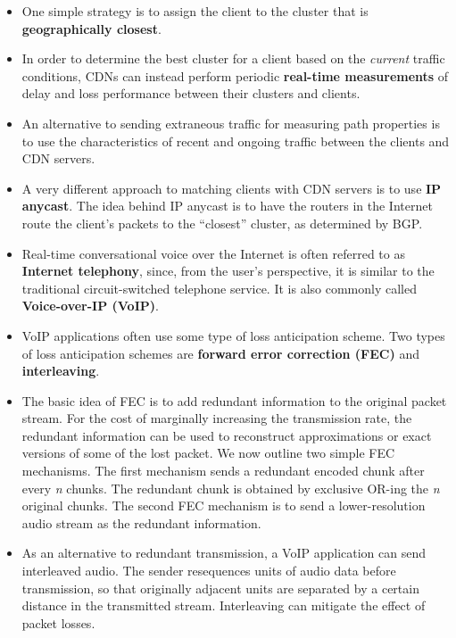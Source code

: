 \begin{itemize}
\item
One simple strategy is to assign the client to the cluster that is \textbf{geographically closest}.

\item
In order to determine the best cluster for a client based on the \textit{current} traffic conditions, CDNs can instead perform periodic \textbf{real-time measurements} of delay and loss performance between their clusters and clients.

\item
An alternative to sending extraneous traffic for measuring path properties is to use the characteristics of recent and ongoing traffic between the clients and CDN servers.

\item
A very different approach to matching clients with CDN servers is to use \textbf{IP anycast}. The idea behind IP anycast is to have the routers in the Internet route the client's packets to the ``closest'' cluster, as determined by BGP.

\item
Real-time conversational voice over the Internet is often referred to as \textbf{Internet telephony}, since, from the user's perspective, it is similar to the traditional circuit-switched telephone service. It is also commonly called \textbf{Voice-over-IP (VoIP)}.

\item
VoIP applications often use some type of loss anticipation scheme. Two types of loss anticipation schemes are \textbf{forward error correction (FEC)} and \textbf{interleaving}.

\item
The basic idea of FEC is to add redundant information to the original packet stream. For the cost of marginally increasing the transmission rate, the redundant information can be used to reconstruct approximations or exact versions of some of the lost packet. We now outline two simple FEC mechanisms. The first mechanism sends a redundant encoded chunk after every \textit{n} chunks. The redundant chunk is obtained by exclusive OR-ing the \textit{n} original chunks. The second FEC mechanism is to send a lower-resolution audio stream as the redundant information.

\item
As an alternative to redundant transmission, a VoIP application can send interleaved audio. The sender resequences units of audio data before transmission, so that originally adjacent units are separated by a certain distance in the transmitted stream. Interleaving can mitigate the effect of packet losses.


\end{itemize}

